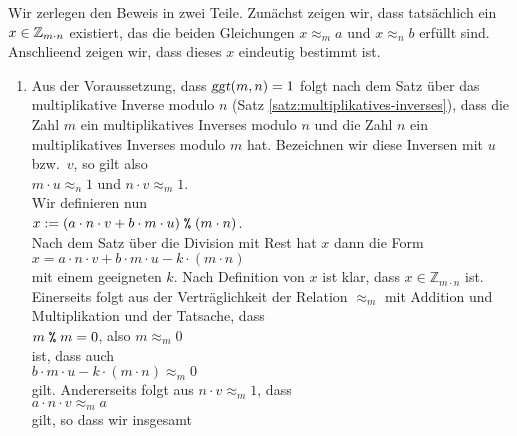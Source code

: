 \proof
Wir zerlegen den Beweis in zwei Teile.  
Zun\"{a}chst zeigen wir, dass tats\"{a}chlich ein $x \in \mathbb{Z}_{m \cdot n}$ existiert, das die beiden
Gleichungen $x \approx_m a$ und  $x \approx_n b$ erf\"{u}llt sind.  Anschlie\3end zeigen wir,
dass dieses $x$ eindeutig bestimmt ist.
\begin{enumerate}
\item Aus der Voraussetzung,
      dass $\textsl{ggt}(m,n) = 1$ folgt nach dem Satz \"{u}ber das multiplikative Inverse modulo
      $n$ (Satz \ref{satz:multiplikatives-inverses}), dass die Zahl $m$ ein multiplikatives
      Inverses modulo $n$ und die Zahl $n$ ein multiplikatives
      Inverses modulo $m$ hat.  Bezeichnen wir diese Inversen mit $u$ bzw.~$v$, so gilt also
      \\[0.2cm]
      \hspace*{1.3cm}
      $m \cdot u \approx_n 1$ \quad und \quad $n \cdot v \approx_m 1$.
      \\[0.2cm]
      Wir definieren nun
      \\[0.2cm]
      \hspace*{1.3cm}
      $x := (a \cdot n \cdot v + b \cdot m \cdot u) \;\texttt{\%}\; (m \cdot n)$.
      \\[0.2cm]
      Nach dem Satz \"{u}ber die Division mit Rest hat $x$ dann die Form
      \\[0.2cm]
      \hspace*{1.3cm}
      $x = a \cdot n \cdot v + b \cdot m \cdot u - k \cdot (m \cdot n)$
      \\[0.2cm]
      mit einem geeigneten $k$.  Nach Definition von $x$ ist klar, dass 
      $x \in \mathbb{Z}_{m \cdot n}$ ist.  Einerseits folgt aus der Vertr\"{a}glichkeit der Relation
      $\approx_m$ mit Addition und Multiplikation und der Tatsache, dass
      \\[0.2cm]
      \hspace*{1.3cm}
      $m \;\texttt{\%}\; m = 0$, \quad also $m \approx_m 0$
      \\[0.2cm]
      ist, dass auch
      \\[0.2cm]
      \hspace*{1.3cm}
      $b \cdot m \cdot u - k \cdot (m \cdot n) \approx_m 0$
      \\[0.2cm]
      gilt.  Andererseits folgt aus $n \cdot v \approx_m  1$, dass
      \\[0.2cm]
      \hspace*{1.3cm}
      $a \cdot n \cdot v \approx_m a$ 
      \\[0.2cm]
      gilt, so dass wir insgesamt

\end{enumerate}

